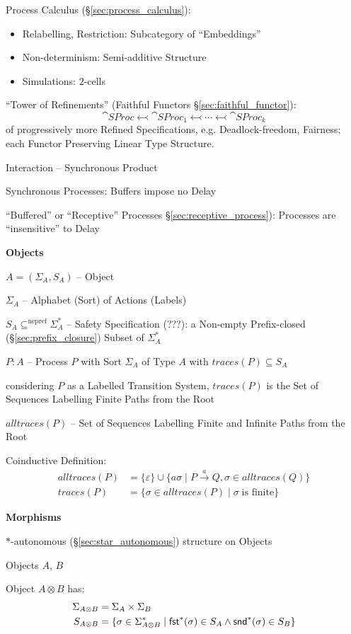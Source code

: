 Process Calculus (\S\ref{sec:process_calculus}):
\begin{itemize}
  \item Relabelling, Restriction: Subcategory of ``Embeddings''
  \item Non-determinism: Semi-additive Structure
  \item Simulations: $2$-cells
\end{itemize}


``Tower of Refinements'' (Faithful Functors
\S\ref{sec:faithful_functor}):
\[
  \cat{SProc} \leftarrowtail \cat{SProc}_1 \leftarrowtail
    \cdots \leftarrowtail \cat{SProc}_k
\]
of progressively more Refined Specifications, e.g. Deadlock-freedom,
Fairness; each Functor Preserving Linear Type Structure.

Interaction -- Synchronous Product

Synchronous Processes: Buffers impose no Delay

``Buffered'' or ``Receptive'' Processes
\S\ref{sec:receptive_process}): Processes are ``insensitive'' to
Delay %


\textbf{Objects}

$A = (\Sigma_A,S_A)$ -- Object

$\Sigma_A$ -- Alphabet (Sort) of Actions (Labels)

$S_A \subseteq^{\text{nepref}} \Sigma_A^*$ -- Safety Specification
(???): a Non-empty Prefix-closed (\S\ref{sec:prefix_closure}) Subset
of $\Sigma_A^*$

$P : A$ -- Process $P$ with Sort $\Sigma_A$ of Type $A$ with
$traces(P) \subseteq S_A$

considering $P$ as a Labelled Transition System, $traces(P)$ is the
Set of Sequences Labelling Finite Paths from the Root

$alltraces(P)$ -- Set of Sequences Labelling Finite and Infinite Paths
from the Root

Coinductive Definition:
\begin{align*}
  alltraces(P) &= \{\varepsilon\} \cup \{a \sigma
    \mid P \xrightarrow{a} Q, \sigma \in alltraces(Q)\} \\
  traces(P) &= \{\sigma \in alltraces(P)
    \mid \sigma \;\text{is finite}\}
\end{align*}


\textbf{Morphisms}

$*$-autonomous (\S\ref{sec:star_autonomous}) structure on Objects

Objects $A$, $B$

Object $A \otimes B$ has:
\begin{align*}
  \Sigma_{A \otimes B} &= \Sigma_A \times \Sigma_B \\
  S_{A \otimes B} &= \{\sigma \in \Sigma_{A \otimes B}^*
    \mid \mathsf{fst}^*(\sigma) \in S_A \wedge \mathsf{snd}^*(\sigma) \in S_B\}
\end{align*}

